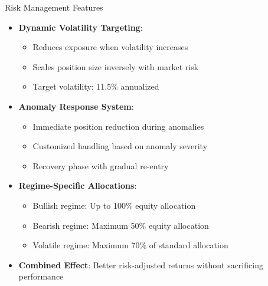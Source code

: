 \documentclass[aspectratio=169,xcolor=dvipsnames]{beamer}
\begin{document}
\begin{frame}{Risk Management Features}
	\begin{itemize}
		\item \textbf{Dynamic Volatility Targeting}:
		      \begin{itemize}
			      \item Reduces exposure when volatility increases
			      \item Scales position size inversely with market risk
			      \item Target volatility: 11.5\% annualized
		      \end{itemize}
		\item \textbf{Anomaly Response System}:
		      \begin{itemize}
			      \item Immediate position reduction during anomalies
			      \item Customized handling based on anomaly severity
			      \item Recovery phase with gradual re-entry
		      \end{itemize}
		\item \textbf{Regime-Specific Allocations}:
		      \begin{itemize}
			      \item Bullish regime: Up to 100\% equity allocation
			      \item Bearish regime: Maximum 50\% equity allocation
			      \item Volatile regime: Maximum 70\% of standard allocation
		      \end{itemize}
		\item \textbf{Combined Effect}: Better risk-adjusted returns without sacrificing performance
	\end{itemize}
\end{frame}
\end{document}
